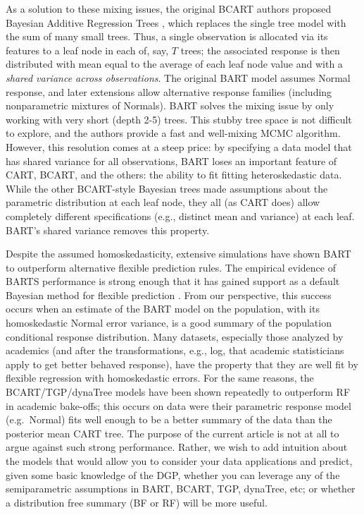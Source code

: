 \documentclass[12pt]{article}
\begin{document}
As a solution to these mixing issues, the original BCART authors
proposed Bayesian Additive Regression Trees \cite{chipman_bart:_2010},
which replaces the single tree model with the sum of many small trees.
Thus, a single observation is allocated via its features to a leaf node
in each of, say, $T$ trees; the associated response is then distributed
with mean equal to the average of each leaf node value and with a
\emph{shared variance across observations}. The original BART model
assumes Normal response, and later extensions allow alternative response
families (including nonparametric mixtures of Normals). BART solves the
mixing issue by only working with very short (depth 2-5) trees. This
stubby tree space is not difficult to explore, and the authors provide a
fast and well-mixing MCMC algorithm. However, this resolution comes at a
steep price: by specifying a data model that has shared variance for all
observations, BART loses an important feature of CART, BCART, and the
others: the ability to fit fitting heteroskedastic data. While the other
BCART-style Bayesian trees made assumptions about the parametric
distribution at each leaf node, they all (as CART does) allow completely
different specifications (e.g., distinct mean and variance) at each
leaf. BART's shared variance removes this property.

Despite the assumed homoskedasticity, extensive simulations have shown
BART to outperform alternative flexible prediction rules. The empirical
evidence of BARTS performance is strong enough that it has gained
support as a default Bayesian method for flexible prediction
\cite{hill_bayesian_2011}. From our perspective, this success occurs
when an estimate of the BART model on the population, with its
homoskedastic Normal error variance, is a good summary of the population
conditional response distribution. Many datasets, especially those
analyzed by academics (and after the transformations, e.g., log, that
academic statisticians apply to get better behaved response), have the
property that they are well fit by flexible regression with
homoskedastic errors. For the same reasons, the BCART/TGP/dynaTree
models have been shown repeatedly to outperform RF in academic
bake-offs; this occurs on data were their parametric response model
(e.g.~Normal) fits well enough to be a better summary of the data than
the posterior mean CART tree. The purpose of the current article is not
at all to argue against such strong performance. Rather, we wish to add
intuition about the models that would allow you to consider your data
applications and predict, given some basic knowledge of the DGP, whether
you can leverage any of the semiparametric assumptions in BART, BCART,
TGP, dynaTree, etc; or whether a distribution free summary (BF or RF)
will be more useful.
\end{document}
